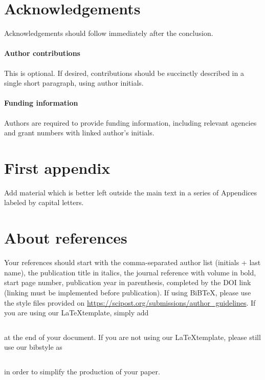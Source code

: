 \documentclass{SciPost}
\begin{document}
\section*{Acknowledgements}
Acknowledgements should follow immediately after the conclusion. 

\paragraph{Author contributions}
This is optional. If desired, contributions should be succinctly described in a single short paragraph, using author initials.

\paragraph{Funding information}
Authors are required to provide funding information, including relevant agencies and grant numbers with linked author's initials.


\begin{appendix}

\section{First appendix}
Add material which is better left outside the main text in a series of Appendices labeled by capital letters.

\section{About references}
Your references should start with the comma-separated author list (initials + last name), the publication title in italics, the journal reference with volume in bold, start page number, publication year in parenthesis, completed by the DOI link (linking must be implemented before publication). If using BiBTeX, please use the style files provided  on \url{https://scipost.org/submissions/author_guidelines}. If you are using our \LaTeX template, simply add 
\begin{verbatim}

\end{verbatim}
at the end of your document. If you are not using our \LaTeX template, please still use our bibstyle as
\begin{verbatim}

\end{verbatim}
in order to simplify the production of your paper.
\end{appendix}
\end{document}
